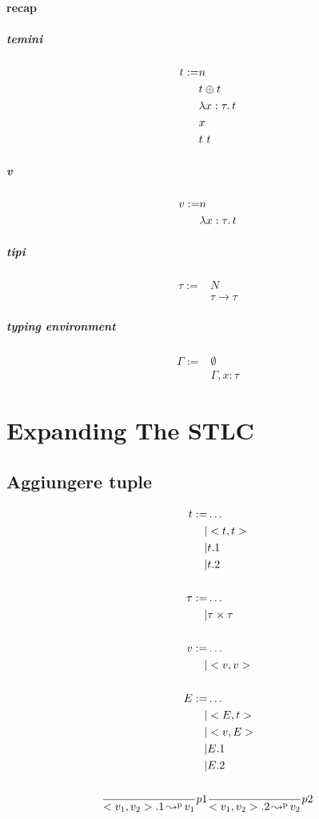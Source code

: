 \documentclass{article}
\begin{document}
\paragraph{recap}
\subparagraph{temini}
\begin{align*}
    t := &n \\
         &t\oplus t \\
         &\lambda x:\tau\ldotp t \\
         &x \\
         &t\ t \\
\end{align*}

\subparagraph{v}
\begin{align*}
    v := &n \\
         &\lambda x:\tau\ldotp t \\
\end{align*}

\subparagraph{tipi}
\begin{align*}
    \tau :=&N \\
           &\tau\to\tau
\end{align*}

\subparagraph{typing environment}
\begin{align*}
    \Gamma := &\emptyset \\
              &\Gamma,x:\tau
\end{align*}

\section{Expanding The STLC}
\subsection{Aggiungere tuple}
\begin{align*}
    t := &\dots \\
    |&<t,t> \\
    |&t.1 \\
    |&t.2 \\
    \\
    \tau:= &\dots \\
    |&\tau\times\tau \\
    \\
    v:=&\dots \\
    |&<v,v> \\
    \\
    E := &\dots \\
    |&<E,t> \\
    |&<v,E> \\
    |&E.1 \\
    |&E.2 \\
    \\
    \frac{}{<v_1,v_2>.1\operatorname{ \leadsto^{p} } v_1}p1 & \frac{}{<v_1,v_2>.2\operatorname{ \leadsto^{p} } v_2}p2
\end{align*}
\end{document}

